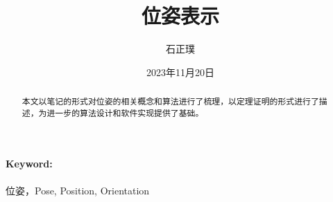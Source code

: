 \documentclass[UTF8,a4paper,10pt]{ctexart}
\title{
  \textbf{位姿表示}
}
\author{石正璞
}
\date{
  2023年11月20日
}
\begin{document}
\maketitle	

\begin{abstract}
  本文以笔记的形式对位姿的相关概念和算法进行了梳理，以定理证明的形式进行了描述，为进一步的算法设计和软件实现提供了基础。
\end{abstract}

\paragraph{Keyword:}位姿，Pose, Position, Orientation



\end{document}
